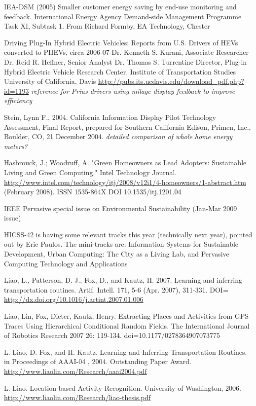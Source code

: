 IEA-DSM (2005) Smaller customer energy saving by end-use monitoring and feedback. International Energy Agency Demand-side Management Programme Task XI, Subtask 1. From Richard Formby, EA Technology, Chester 

Driving Plug-In Hybrid Electric Vehicles: Reports from U.S. Drivers of HEVs  
converted to PHEVs, circa 2006-07 Dr. Kenneth S. Kurani, Associate Researcher 
Dr. Reid R. Heffner, Senior Analyst Dr. Thomas S. Turrentine Director, Plug-in Hybrid Electric Vehicle Research Center. Institute of Transportation Studies 
University of California, Davis \url{http://pubs.its.ucdavis.edu/download_pdf.php?id=1193} \emph{reference for Prius drivers using milage display feedback to improve efficiency}

Stein, Lynn F., 2004. California Information Display Pilot Technology Assessment, Final Report, prepared for Southern California Edison, Primen, Inc., Boulder, CO, 21 December 2004. \emph{detailed comparison of whole home energy meters?}

Hasbrouck, J.; Woodruff, A. "Green Homeowners as Lead Adopters: Sustainable Living and Green Computing." Intel Technology Journal. \url{http://www.intel.com/technology/itj/2008/v12i1/4-homeowners/1-abstract.htm} (February 2008). ISSN 1535-864X DOI 10.1535/itj.1201.04

IEEE Pervasive special issue on Environmental Sustainability (Jan-Mar 2009 issue)

HICSS-42 is having some relevant tracks this year (technically next year), pointed out by Eric Paulos. The mini-tracks are: Information Systems for Sustainable Development, Urban Computing: The City as a Living Lab, and Pervasive Computing Technology and Applications

Liao, L., Patterson, D. J., Fox, D., and Kautz, H. 2007. Learning and inferring transportation routines. Artif. Intell. 171, 5-6 (Apr. 2007), 311-331. DOI= \url{http://dx.doi.org/10.1016/j.artint.2007.01.006}

Liao, Lin, Fox, Dieter, Kautz, Henry. Extracting Places and Activities from GPS Traces Using Hierarchical Conditional Random Fields. The International Journal of Robotics Research 2007 26: 119-134. doi=10.1177/0278364907073775

L. Liao, D. Fox, and H. Kautz. Learning and Inferring Transportation Routines. in Proceedings of AAAI-04 , 2004. Outstanding Paper Award. \url{http://www.liaolin.com/Research/aaai2004.pdf}

L. Liao. Location-based Activity Recognition. University of Washington, 2006. \url{http://www.liaolin.com/Research/liao-thesis.pdf}

